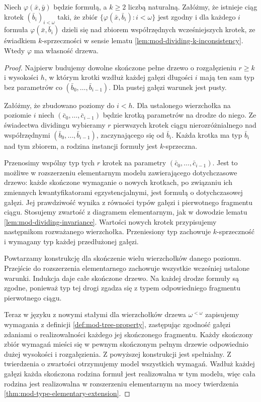 \begin{lemat}
\label{lem:mod-dividing-chain-tree}
Niech $\varphi(\bar x,\bar y)$ będzie formułą,
a $k\geq2$ liczbą naturalną.
Załóżmy, że istnieje ciąg krotek
$(\bar b_i)_{i<\omega}$ taki, że zbiór
$\{\varphi(\bar x,\bar b_i):i<\omega\}$
jest zgodny i dla każdego $i$ formuła
$\varphi(\bar x,\bar b_i)$ dzieli się
nad zbiorem współrzędnych wcześniejszych
krotek, ze świadkiem $k$-sprzeczności
w sensie lematu \ref{lem:mod-dividing-k-inconsistency}.
Wtedy $\varphi$ ma własność drzewa.
\end{lemat}
\begin{proof}
Najpierw budujemy dowolne skończone
pełne drzewo o rozgałęzieniu $r\geq k$
i wysokości $h$, w którym krotki wzdłuż
każdej gałęzi długości $i$ mają ten sam
typ bez parametrów co
$(\bar b_0,\ldots,\bar b_{i-1})$.
Dla pustej gałęzi warunek jest pusty.

Załóżmy, że zbudowano poziomy do $i<h$.
Dla ustalonego wierzchołka na poziomie $i$
niech $(\bar c_0,\ldots,\bar c_{i-1})$
będzie krotką parametrów na drodze do niego.
Ze świadectwa dividingu wybieramy $r$
pierwszych krotek ciągu nierozróżnialnego
nad współrzędnymi
$(\bar b_0,\ldots,\bar b_{i-1})$,
zaczynającego się od $\bar b_i$.
Każda krotka ma typ $\bar b_i$
nad tym zbiorem, a rodzina instancji
formuły jest $k$-sprzeczna.

Przenosimy wspólny typ tych $r$ krotek
na parametry
$(\bar c_0,\ldots,\bar c_{i-1})$.
Jest to możliwe w rozszerzeniu elementarnym
modelu zawierającego dotychczasowe drzewo:
każde skończone wymaganie o nowych krotkach,
po związaniu ich zmiennych kwantyfikatorami
egzystencjalnymi, jest formułą o dotychczasowej
gałęzi. Jej prawdziwość wynika z równości
typów gałęzi i pierwotnego fragmentu ciągu.
Stosujemy zwartość z diagramem elementarnym,
jak w dowodzie lematu
\ref{lem:mod-dividing-invariance}.
Wartości nowych krotek przypisujemy
następnikom rozważanego wierzchołka.
Przeniesiony typ zachowuje $k$-sprzeczność
i wymagany typ każdej przedłużonej gałęzi.

Powtarzamy konstrukcję dla skończenie
wielu wierzchołków danego poziomu.
Przejście do rozszerzenia elementarnego
zachowuje wszystkie wcześniej ustalone
warunki. Indukcja daje całe skończone drzewo.
Na każdej drodze formuły są zgodne,
ponieważ typ tej drogi zgadza się z typem
odpowiedniego fragmentu pierwotnego ciągu.

Teraz w języku z nowymi stałymi dla
wierzchołków drzewa $\omega^{<\omega}$
zapisujemy wymagania z definicji
\ref{def:mod-tree-property}, zastępując
zgodność gałęzi zdaniami o realizowalności
każdego jej skończonego fragmentu.
Każdy skończony zbiór wymagań mieści się
w pewnym skończonym pełnym drzewie
odpowiednio dużej wysokości i rozgałęzienia.
Z powyższej konstrukcji jest spełnialny.
Z twierdzenia o zwartości otrzymujemy
model wszystkich wymagań. Wzdłuż każdej
gałęzi każda skończona rodzina formuł jest
realizowalna w tym modelu, więc cała rodzina
jest realizowalna w rozszerzeniu elementarnym
na mocy twierdzenia
\ref{thm:mod-type-elementary-extension}.
\end{proof}

